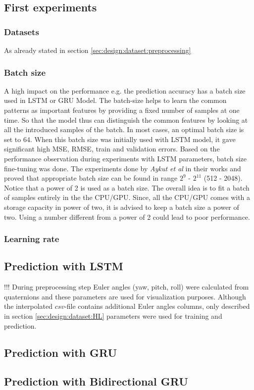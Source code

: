 \subsection{First experiments}
\label{sec:eval:experiments:early}

\subsubsection{Datasets}
\label{sec:eval:experiments:early:ds}
As already stated in section \ref{sec:design:dataset:preprocessing}

\subsubsection{Batch size}
\label{sec:eval:experiments:early:batch}
A high impact on the performance e.g. the prediction accuracy has a batch size used in LSTM or GRU Model. The batch-size helps to learn the common patterns as important features by providing a fixed number of samples at one time. So that the model thus can distinguish the common features by looking at all the introduced samples of the batch. In most cases, an optimal batch size is set to 64. When this batch size was initially used with LSTM model, it gave significant high MSE, RMSE, train and validation errors. Based on the performance observation during experiments with LSTM parameters, batch size fine-tuning was done. The experiments done by \textit{Aykut et al} in their works \cite{delay_compensation_360} and \cite{telepresence} proved that appropriate batch size can be found in range $2^{9}$ - $2^{11}$ (512 - 2048). Notice that a power of 2 is used as a batch size. The overall idea is to fit a batch of samples entirely in the the CPU/GPU. Since, all the CPU/GPU comes with a storage capacity in power of two, it is advised to keep a batch size a power of two. Using a number different from a power of 2 could lead to poor performance.

\subsubsection{Learning rate}
\label{sec:eval:experiments:early:lr}

\subsection{Prediction with LSTM}
\label{sec:eval:experiments:lstm}
!!!
During preprocessing step Euler angles (yaw, pitch, roll) were calculated from quaternions and these parameters are used for visualization purposes. Although the interpolated $csv$-file contains additional Euler angles columns, only described in section \ref{sec:design:dataset:HL} parameters were used for training and prediction.

\subsection{Prediction with GRU}
\label{sec:eval:experiments:gru}

\subsection{Prediction with Bidirectional GRU}
\label{sec:eval:experiments:bi-gru}